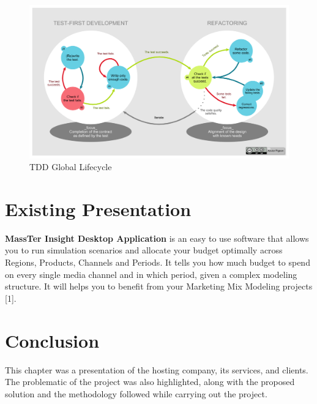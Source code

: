 \documentclass[12pt]{article}
\begin{document}
		\begin{figure}[h]
		\centering
		\includegraphics[width=1\textwidth]{TDD_Global_Lifecycle.png}
		\caption{TDD Global Lifecycle}
	\end{figure}   
	\section{Existing Presentation}
	\textbf{MassTer Insight Desktop Application} is an easy to use software that allows you to run simulation scenarios and allocate your budget optimally across Regions, Products, Channels and Periods. It tells you how much budget to spend on every single media channel and in which period, given a complex modeling structure. It will helps you to benefit from your Marketing Mix Modeling projects [1]. 

	\section{Conclusion}
	This chapter was a presentation of the hosting company, its services, and clients. The problematic of the project was also highlighted, along with the proposed solution and the methodology followed while carrying out the project.
	
	 
\end{document}
